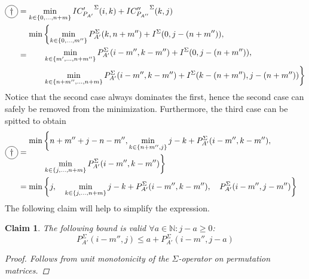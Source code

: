 \documentclass[twoside,11pt,openright]{report}
\newcommand*{\circled}[1]{\tikz[baseline=(char.base)]{
                          \node[shape=circle,draw,inner sep=2pt] (char) {#1};}}
\newtheorem{claim}{Claim}
\begin{document}
\begin{align*}
  \circled{$\dagger$} &= \min_{k\in \{ 0, \dots, n + m \}} { {IC'_{P_{A'}}}^{\Sigma}(i, k) + {IC''_{P_{A''}}}^{\Sigma}(k, j) } \\
              &=  \begin{aligned} \min
                    &\left\{
                      \min_{k \in \{0, \dots, m''\}} { P_{A'}^{\Sigma}(k, n + m'') + I^{\Sigma}(0, j - (n + m'')) }, \right. \\
                    &\left.
                      \min_{k \in \{m', \dots, n + m''\}} {P_{A'}^{\Sigma}(i - m'', k - m'') + I^{\Sigma}(0, j - (n + m''))}, \right. \\
                    &\left.
                      \min_{k \in \{ n + m'', \dots, n + m \}} {P_{A'}^{\Sigma}(i - m'', k - m'') + I^{\Sigma}(k - (n + m''), j - (n + m''))}
                    \right\}
                  \end{aligned}
\end{align*}
Notice that the second case always dominates the first, hence the second case can safely be removed from the minimization. Furthermore, the third case can be spitted to obtain
\begin{align*}
  \circled{$\dagger$} &=  \begin{aligned} \min
                    &\left\{
                      n + m'' + j - n - m'',
                      \min_{k \in \{n + m'', j\}} {j - k + P_{A'}^{\Sigma}(i - m'', k - m'')}, \right. \\
                    &\left.
                      \min_{k \in \{j, \dots, n + m\}} {P_{A'}^{\Sigma}(i - m'', k - m'')}
                    \right\}
                  \end{aligned} \\
              &= \begin{aligned} \min
                    &\left\{
                      j,\quad
                      \min_{k \in \{j, \dots, n + m\}} {j - k + P_{A'}^{\Sigma}(i - m'', k - m'')},\quad
                      P_{A'}^{\Sigma}(i - m'', j - m'')
                    \right\}
                  \end{aligned}
\end{align*}
The following claim will help to simplify the expression.
\begin{claim}
  \label{claim:bounding-sigma-col}
  The following bound is valid $\forall a \in \mathbb{N}: j - a \geq 0$:
  \[
    P_{A'}^{\Sigma}(i - m'', j) \leq a + P_{A'}^{\Sigma}(i - m'', j - a)
  \]
  \begin{proof}
    Follows from unit monotonicity of the $\Sigma$-operator on permutation matrices.
  \end{proof}
\end{claim}
\end{document}
